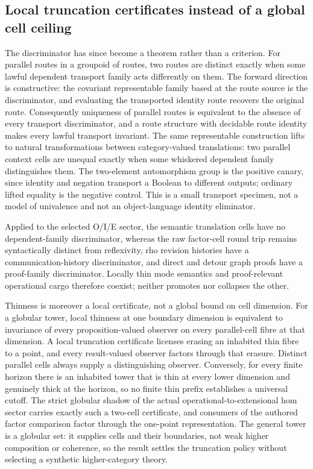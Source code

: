 \documentclass[11pt]{article}
\theoremstyle{definition}
\theoremstyle{remark}
\begin{document}
\subsection{Local truncation certificates instead of a global cell ceiling}

The discriminator has since become a theorem rather than a criterion.  For
parallel routes in a groupoid of routes, two routes are distinct exactly when
some lawful dependent transport family acts differently on them.  The forward
direction is constructive: the covariant representable family based at the
route source is the discriminator, and evaluating the transported identity
route recovers the original route.  Consequently uniqueness of parallel routes
is equivalent to the absence of every transport discriminator, and a route
structure with decidable route identity makes every lawful transport
invariant.  The same representable construction lifts to natural
transformations between category-valued translations: two parallel context
cells are unequal exactly when some whiskered dependent family distinguishes
them.  The two-element automorphism group is the positive canary, since
identity and negation transport a Boolean to different outputs; ordinary
lifted equality is the negative control.  This is a small transport specimen,
not a model of univalence and not an object-language identity eliminator.

Applied to the selected O/I/E sector, the semantic translation cells have no
dependent-family discriminator, whereas the raw factor-cell round trip remains
syntactically distinct from reflexivity, rho revision histories have a
communication-history discriminator, and direct and detour graph proofs have a
proof-family discriminator.  Locally thin mode semantics and proof-relevant
operational cargo therefore coexist; neither promotes nor collapses the other.

Thinness is moreover a local certificate, not a global bound on cell
dimension.  For a globular tower, local thinness at one boundary dimension is
equivalent to invariance of every proposition-valued observer on every
parallel-cell fibre at that dimension.  A local truncation certificate
licenses erasing an inhabited thin fibre to a point, and every result-valued
observer factors through that erasure.  Distinct parallel cells always supply
a distinguishing observer.  Conversely, for every finite horizon there is an
inhabited tower that is thin at every lower dimension and genuinely thick at
the horizon, so no finite thin prefix establishes a universal cutoff.  The
strict globular shadow of the actual operational-to-extensional hom sector
carries exactly such a two-cell certificate, and consumers of the authored
factor comparison factor through the one-point representation.  The general
tower is a globular set: it supplies cells and their boundaries, not weak
higher composition or coherence, so the result settles the truncation policy
without selecting a synthetic higher-category theory.
\end{document}
